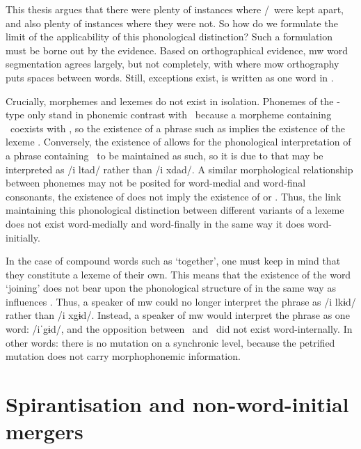 This thesis argues that there were plenty of instances where \lT/\xD\ were kept apart, and also plenty of instances where they were not. 
So how do we formulate the limit of the applicability of this phonological distinction?
Such a formulation must be borne out by the evidence. Based on orthographical evidence, \gls{mw} word segmentation agrees largely, but not completely, with where \gls{mow} orthography puts spaces between words.
Still, exceptions exist, \eg {} is written as  one word in .

Crucially, morphemes and lexemes do not exist in isolation. 
Phonemes of the \lT -type only stand in phonemic contrast with \xD\ because a morpheme containing \lT\ coexists with \xT, so the existence of a phrase such as  implies the existence of the lexeme .
Conversely, the existence of  allows for the phonological interpretation of a phrase containing \lT\ to be maintained as such, so it is due to  that  may be interpreted as /i \gls{l}tad/ rather than /i \gls{x}dad/.
A similar morphological relationship between phonemes may not be posited for word-medial and word-final consonants, \eg the existence of  does not imply the existence of  or .
Thus, the link maintaining this phonological distinction between different variants of a lexeme does not exist word-medially and word-finally in the same way it does word-initially.

In the case of compound words such as  `together', one must keep in mind that they constitute a lexeme of their own. This means that the existence of the word  `joining' does not bear upon the phonological structure of  in the same way as  influences .  Thus, a speaker of \gls{mw} could no longer  interpret the phrase  as /i \gls{l}kɨd/ rather than /i \gls{x}gɨd/. Instead, a speaker of \gls{mw} would interpret the phrase as one word: /iˈgɨd/, and the opposition between \lT\ and \xD\ did not exist word-internally. In other words: there is no mutation on a synchronic level, because the petrified mutation does not carry morphophonemic information.





\section{Spirantisation and non-word-initial mergers}
\label{sec:spirantization}

